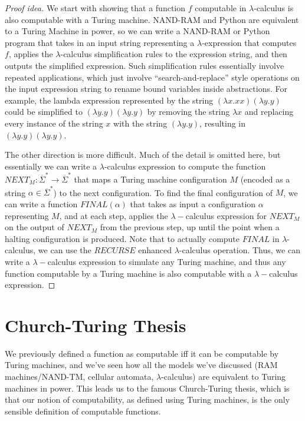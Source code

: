 \documentclass[11pt]{article}
\theoremstyle{definition}
\theoremstyle{remark}
\begin{document}
\begin{proof}[Proof idea]

We start with showing that a function $f$ computable in $\lambda$-calculus is also computable with a Turing machine. NAND-RAM and Python are equivalent to a Turing Machine in power, so we can write a NAND-RAM or Python program that takes in an input string representing a $\lambda$-expression that computes $f$, applies the $\lambda$-calculus simplification rules to the expression string, and then outputs the simplified expression. Such simplification rules essentially involve repeated applications, which just involve ``search-and-replace'' style operations on the input expression string to rename bound variables inside abstractions. For example, the lambda expression represented by the string  $(\lambda x. x x) (\lambda y.y) $ could be simplified to $(\lambda y.y) (\lambda y.y)$ by removing the string $\lambda x$ and replacing every instance of the string $x$  with the string $(\lambda y.y)$, resulting in $(\lambda y.y)(\lambda y.y)$.

The other direction is more difficult. Much of the detail is omitted here, but essentially we can write a $\lambda$-calculus expression to compute the function $NEXT_M: \overline{\Sigma}^* \to \overline{\Sigma}^*$ that maps a Turing machine configuration $M$ (encoded as a string $\alpha \in \overline{\Sigma}^*$) to the next configuration. To find the final configuration of $M$, we can write a function $FINAL(\alpha)$ that takes as input a configuration $\alpha$ representing $M$, and at each step, applies the $\lambda-$calculus expression for $NEXT_M$ on the output of $NEXT_M$ from the previous step, up until the point when a halting configuration is produced. Note that to actually compute $FINAL$ in $\lambda$-calculus, we can use the $RECURSE$ enhanced $\lambda$-calculus operation. Thus, we can write a $\lambda-$calculus expression to simulate any Turing machine, and thus any function computable by a Turing machine is also computable with a $\lambda-$calculus expression.
\end{proof}


\section{Church-Turing Thesis}

We previously defined a function as computable iff it can be computable by Turing machines, and we've seen how all the models we've discussed (RAM machines/NAND-TM, cellular automata, $\lambda$-calculus) are equivalent to Turing machines in power. This leads us to the famous Church-Turing thesis, which is that our notion of computability, as defined using Turing machines, is the only sensible definition of computable functions. 
\end{document}
